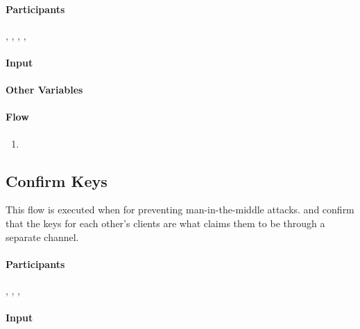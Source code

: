 \documentclass[a4paper,10pt]{article}
\begin{document}
\paragraph{Participants} , , , , \Server{}

\paragraph{Input}
\SpecialItem
\begin{description}
 \item[]
\end{description}

\paragraph{Other Variables}
\SpecialItem
\begin{description}
 \item[]
\end{description}

\paragraph{Flow}

\begin{enumerate}
 \item
\end{enumerate}

\subsection{Confirm Keys}
\label{confirm_keys_flow}
This flow is executed when for preventing man-in-the-middle attacks.  and  confirm that the keys for each other's clients are what \Server{} claims them to be 
through a separate channel.

\paragraph{Participants} , , , 

\paragraph{Input}
\SpecialItem
\begin{description}
 \item[]
\end{description}
\end{document}
